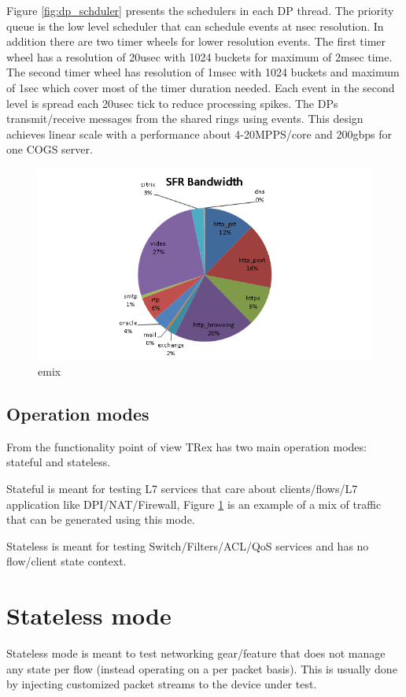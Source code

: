 \documentclass[letterpaper]{article}
\begin{document}
Figure \ref{fig:dp_schduler} presents the schedulers in each DP thread. The priority queue is the low level scheduler that can schedule events at nsec resolution. In addition there are two timer wheels for lower resolution events. The first timer wheel has a resolution of 20usec with 1024 buckets for maximum of 2msec time. 
The second timer wheel has resolution of 1msec with 1024 buckets and maximum of 1sec which cover most of the timer duration needed. Each event in the second level is spread each 20usec tick to reduce processing spikes. 
The DPs transmit/receive messages from the shared rings using events. 
This design achieves linear scale with a performance about 4-20MPPS/core and 200gbps for one COGS server. 

\begin{figure}[h]
\includegraphics[width=0.4
\textwidth, center]{sfr_profile.png}
\caption{emix}
\label{fig:emix}
\end{figure}

\subsection{Operation modes}

From the functionality point of view TRex has two main operation modes: stateful and stateless. 

Stateful is meant for testing L7 services that care about clients/flows/L7 application like DPI/NAT/Firewall, Figure \ref{fig:emix} is an example of a mix of traffic that can be generated using this mode. 

Stateless is meant for testing Switch/Filters/ACL/QoS services and has no flow/client state context.

\section{Stateless mode}

Stateless mode is meant to test networking gear/feature that does not manage any state per flow (instead operating on a per packet basis). 
This is usually done by injecting customized packet streams to the device under test.
\end{document}

